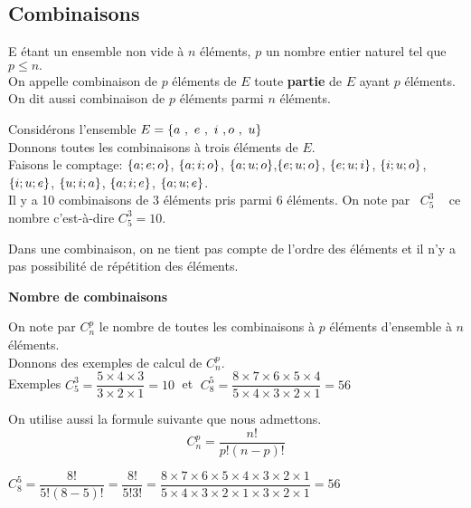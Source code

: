 \subsection{Combinaisons}
\begin{definition}
E étant un ensemble non vide à $ n $ éléments, $ p $ un nombre entier naturel tel que $ p\leq n. $\\
On appelle combinaison de $ p $ éléments de $ E $ toute \textbf{partie}  de $ E $ ayant $ p $ éléments.\\
On dit aussi combinaison de $ p $ éléments parmi $ n $ éléments.
\end{definition}
\begin{example}

Considérons l'ensemble $ E=\left\{a~, ~e ~, ~i ~, o~, ~u\right\} $\\
Donnons toutes les combinaisons  à trois éléments   de $ E. $\\
Faisons le comptage: $ \left\{a; e; o\right\} $,  $ \left\{a; i; o\right\} $, $ \left\{a; u; o\right\} $,$ \left\{e; u; o\right\} $, $ \left\{e; u; i\right\} $, $ \left\{i; u; o\right\} $, $ \left\{i; u; e\right\} $, $ \left\{u; i; a\right\} $,  $ \left\{a; i; e\right\} $, $ \left\{a; u; e\right\} $.\\
Il y a 10 combinaisons de 3 éléments pris parmi 6 éléments.  On note par ~$ C_{5}^{3} $ ~ ce nombre  c'est-à-dire $ C_{5}^{3}=10 $.
\end{example}
\begin{remark}

Dans une combinaison, on ne tient pas compte de l'ordre des éléments et il n'y a pas possibilité  de répétition des éléments.
\end{remark}
\textbf{Nombre de combinaisons}

On note par $ C_{n}^{p} $ le nombre de toutes les combinaisons à $ p $ éléments d'ensemble à $ n $  éléments. \\Donnons des exemples de  calcul  de $ C_{n}^{p} $.\\
Exemples\;  $ C_{5}^{3}= \dfrac{  5\times 4\times 3}{ 3\times 2\times 1}=10 \;$ et $ \;C_{8}^{5}= \dfrac{8 \times7 \times6\times 5\times 4}{5 \times4\times 3\times 2\times 1}=56 $

\bigskip


On utilise aussi la formule suivante que nous admettons.
\[  C_{n}^{p}=\dfrac{n!}{p!(n-p)!} \]



$ C_{8}^{5}=\dfrac{8!}{5!(8-5)!}=\dfrac{8!}{5!3!}=\dfrac{8\times7\times6\times5\times4\times3\times2\times1}{5\times4\times3\times2\times1\times3\times2\times1}=56 $

